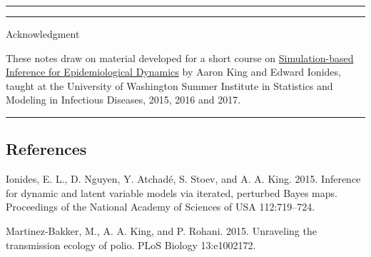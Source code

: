 \documentclass[]{article}
\begin{document}
\begin{center}\rule{0.5\linewidth}{\linethickness}\end{center}

\begin{center}\rule{0.5\linewidth}{\linethickness}\end{center}

Acknowledgment

These notes draw on material developed for a short course on
\href{http://kingaa.github.io/sbied/}{Simulation-based Inference for
Epidemiological Dynamics} by Aaron King and Edward Ionides, taught at
the University of Washington Summer Institute in Statistics and Modeling
in Infectious Diseases, 2015, 2016 and 2017.

\begin{center}\rule{0.5\linewidth}{\linethickness}\end{center}

\subsection*{References}\label{references}

\hypertarget{refs}{}
\hypertarget{ref-ionides15}{}
Ionides, E. L., D. Nguyen, Y. Atchadé, S. Stoev, and A. A. King. 2015.
Inference for dynamic and latent variable models via iterated, perturbed
Bayes maps. Proceedings of the National Academy of Sciences of USA
112:719--724.

\hypertarget{ref-martinez-bakker15}{}
Martinez-Bakker, M., A. A. King, and P. Rohani. 2015. Unraveling the
transmission ecology of polio. PLoS Biology 13:e1002172.
\end{document}
